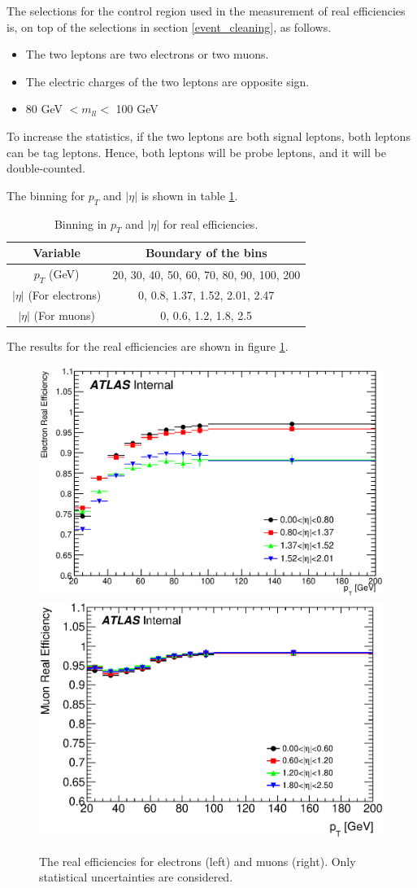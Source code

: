 The selections for the control region used in the measurement of real efficiencies is, on top of the selections in section \ref{event_cleaning}, as follows.
\begin{itemize}
\item The two leptons are two electrons or two muons.
\item The electric charges of the two leptons are opposite sign.
\item 80 GeV $< m_{ll} <$ 100 GeV
\end{itemize}

To increase the statistics, if the two leptons are both signal leptons, both leptons can be tag leptons.
Hence, both leptons will be probe leptons, and it will be double-counted.

The binning for $p_T$ and $|\eta|$ is shown in table \ref{tab:binning_real_eff}.
\begin{table}[htbp]
\centering
\begin{tabular}{|c|c|}
\hline
Variable & Boundary of the bins \\
\hline
$p_T$ (GeV) &  20, 30, 40, 50, 60, 70, 80, 90, 100, 200 \\
\hline
$|\eta|$ (For electrons) & 0, 0.8, 1.37, 1.52, 2.01, 2.47 \\
\hline
$|\eta|$ (For muons) & 0, 0.6, 1.2, 1.8, 2.5 \\
\hline
\end{tabular}
\caption{Binning in $p_T$ and $|\eta|$ for real efficiencies.}
\label{tab:binning_real_eff}
\end{table}

The results for the real efficiencies are shown in figure \ref{fig:result_real_eff}.
\begin{figure}[htpb]
\centering
\includegraphics[width=0.49\linewidth]{data/plot/plotRealEffs/El_hEff.eps}
\includegraphics[width=0.49\linewidth]{data/plot/plotRealEffs/Mu_hEff.eps}
\caption{The real efficiencies for electrons (left) and muons (right). Only statistical uncertainties are considered.}
\label{fig:result_real_eff}
\end{figure}

